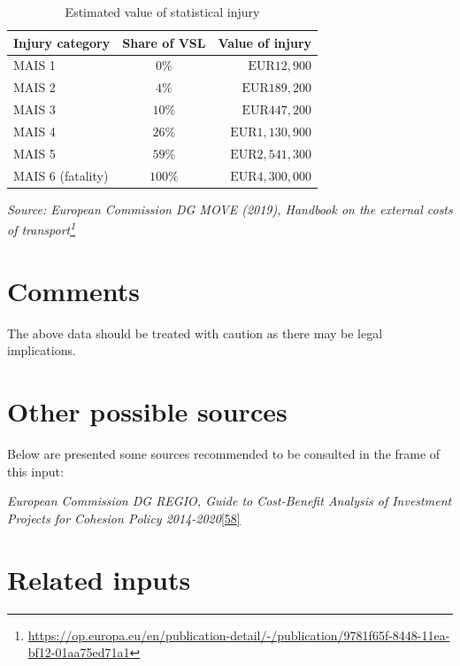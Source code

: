 \documentclass[
  11pt,
  a4paper,
]{book}
\DeclareRobustCommand{\href}[2]{#2\footnote{\url{#1}}}
\begin{document}
\hypertarget{tbl-value-of-injury}{}
\setlength{\LTpost}{0mm}
\begin{longtable}{lcr}
\caption{\label{tbl-value-of-injury}Estimated value of statistical injury }\tabularnewline

\toprule
Injury category & Share of VSL & Value of injury \\ 
\midrule
MAIS 1 & $0\%$ & $\text{EUR}12,900$ \\ 
MAIS 2 & $4\%$ & $\text{EUR}189,200$ \\ 
MAIS 3 & $10\%$ & $\text{EUR}447,200$ \\ 
MAIS 4 & $26\%$ & $\text{EUR}1,130,900$ \\ 
MAIS 5 & $59\%$ & $\text{EUR}2,541,300$ \\ 
MAIS 6 (fatality) & $100\%$ & $\text{EUR}4,300,000$ \\ 
\bottomrule
\end{longtable}
\begin{minipage}{\linewidth}
\emph{\href{https://op.europa.eu/en/publication-detail/-/publication/9781f65f-8448-11ea-bf12-01aa75ed71a1}{Source: European Commission DG MOVE (2019), Handbook on the external costs of transport}}\\
\end{minipage}

\hypertarget{comments-14}{%
\section{Comments}\label{comments-14}}

The above data should be treated with caution as there may be legal
implications.

\hypertarget{other-possible-sources-7}{%
\section{Other possible sources}\label{other-possible-sources-7}}

Below are presented some sources recommended to be consulted in the
frame of this input:

\emph{European Commission DG REGIO, Guide to Cost-Benefit Analysis of
Investment Projects for Cohesion Policy
2014-2020}\protect\hyperlink{ref-ecdgregio2014}{{[}58{]}}

\hypertarget{related-inputs-28}{%
\section{Related inputs}\label{related-inputs-28}}
\end{document}
